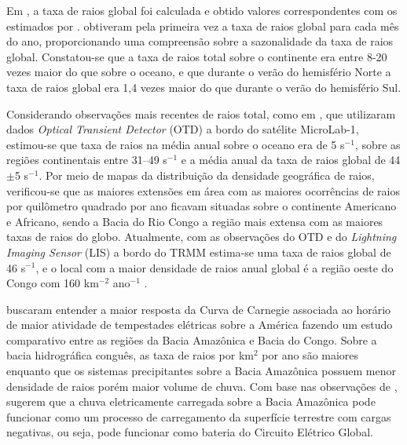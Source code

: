 Em , a taxa de raios global foi calculada e obtido valores correspondentes com os estimados por .   obtiveram pela primeira vez a taxa de raios global para cada mês do ano, proporcionando uma compreensão sobre a sazonalidade da taxa de raios global. Constatou-se que a taxa de raios total sobre o continente era entre 8-20 vezes maior do que sobre o oceano, e que durante o verão do hemisfério Norte a taxa de raios global era 1,4 vezes maior do que durante o verão do hemisfério Sul.


Considerando observações mais recentes de raios total, como em \cite{christian2003global}, que utilizaram dados \textit{Optical Transient Detector} (OTD) a bordo do satélite MicroLab-1,  estimou-se que taxa de raios na média anual sobre o oceano era de 5 s$^{-1}$, sobre as regiões continentais entre 31--49 s$^{-1}$ e a  média anual da taxa de raios global de 44$\pm$5 s$^{-1}$. Por meio de mapas da distribuição da densidade geográfica de raios, verificou-se que as maiores extensões em área com as maiores ocorrências de raios por quilômetro quadrado por ano ficavam situadas sobre o continente Americano e Africano, sendo a Bacia do Rio Congo a região mais extensa com as maiores taxas de raios do globo. Atualmente, com as observações do OTD e do \textit{Lightning Imaging Sensor} (LIS) a bordo do TRMM estima-se uma taxa de raios global de 46 s$^{-1}$, e o local com a maior densidade de raios anual global é a região oeste do Congo com 160   km$^{-2}$ ano$^{-1}$ \cite{cecil2014gridded}.

 buscaram entender a maior resposta da Curva de Carnegie associada ao horário de maior atividade de tempestades elétricas sobre a América fazendo um estudo comparativo entre as regiões da Bacia Amazônica e Bacia do Congo. Sobre a bacia hidrográfica conguês, as taxa de raios por km$^2$ por ano são maiores enquanto que os sistemas precipitantes sobre a Bacia Amazônica possuem menor densidade de raios porém maior volume de chuva. Com base nas observações de ,  sugerem que a chuva eletricamente carregada sobre a Bacia Amazônica pode funcionar como um processo de carregamento da superfície terrestre com cargas negativas, ou seja, pode funcionar como bateria do Circuito Elétrico Global.

